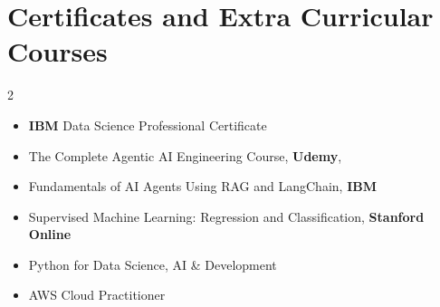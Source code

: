 \documentclass[a4paper,12pt]{article}
\begin{document}

\section{Certificates and Extra Curricular Courses}
\begin{multicols}{2}
    \begin{itemize}[nosep,after=\strut, leftmargin=2em, itemsep=5pt]
        \item[•]  \textbf{IBM} Data Science Professional Certificate 
        \item[•] The Complete Agentic AI Engineering Course, \textbf{Udemy}, 
        \item[•]Fundamentals of AI Agents Using RAG and LangChain, \textbf{IBM}
        \item[•] Supervised Machine Learning: Regression and Classification, \textbf{Stanford Online}     
        \item[•]Python for Data Science, AI \& Development
        \item[•]AWS Cloud Practitioner


    \end{itemize}

\end{multicols}

\end{document}
